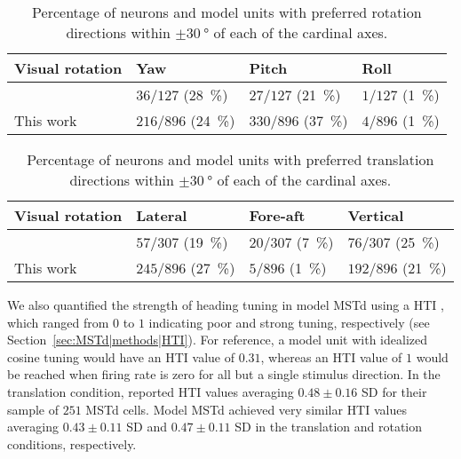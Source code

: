 \begin{table}[h]
 \centering
 \caption{Percentage of neurons and model units with preferred rotation directions within $\pm \SI{30}{\degree}$ of each of the cardinal axes.}
 \begin{tabular}{|llll|}
 \hline
 Visual rotation & Yaw & Pitch & Roll \\
 \hline
 \cite{Takahashi2007} & $36/127$ (\SI{28}{\percent})
 & $27/127$ (\SI{21}{\percent}) & $1/127$ (\SI{1}{\percent}) \\
 This work & $216/896$ (\SI{24}{\percent}) & $330/896$ (\SI{37}{\percent})
 & $4/896$ (\SI{1}{\percent}) \\
 \hline
 \end{tabular}
 \label{tbl:MSTd|visrot}
\end{table}

\begin{table}[h]
 \centering
 \caption{Percentage of neurons and model units with preferred translation directions within $\pm \SI{30}{\degree}$ of each of the cardinal axes.}
 \begin{tabular}{|llll|}
 \hline
 Visual rotation & Lateral & Fore-aft & Vertical \\
 \hline
 \cite{Takahashi2007} & $57/307$ (\SI{19}{\percent})
 & $20/307$ (\SI{7}{\percent}) & $76/307$ (\SI{25}{\percent}) \\
 This work & $245/896$ (\SI{27}{\percent}) & $5/896$ (\SI{1}{\percent})
 & $192/896$ (\SI{21}{\percent}) \\
 \hline
 \end{tabular}
 \label{tbl:MSTd|vistrans}
\end{table}

We also quantified the strength of heading tuning in model \ac{MSTd} using
a \acf{HTI} \citep{Gu2006}, which ranged from $0$ to $1$ indicating poor and
strong tuning, respectively (see Section~\ref{sec:MSTd|methods|HTI}). 
For reference, a model unit with idealized cosine tuning would have an 
\ac{HTI} value of $0.31$, whereas an \ac{HTI} value of $1$ would be reached
when firing rate is zero for all but a single stimulus direction. 
In the translation condition, \cite{Gu2006} reported \ac{HTI} values 
averaging $0.48 \pm 0.16$ SD for their sample of $251$ \ac{MSTd} cells. 
Model \ac{MSTd} achieved very similar \ac{HTI} values averaging 
$0.43 \pm 0.11$ SD and $0.47 \pm 0.11$ SD in the translation and rotation
conditions, respectively.

